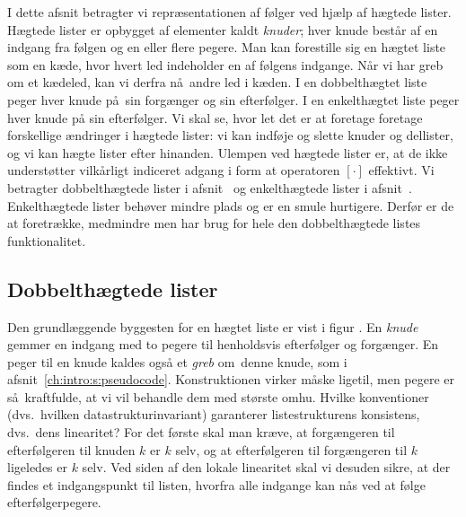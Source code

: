 \newcommand{\friListe}{\Id{friListe}}

I dette afsnit betragter vi repræsentationen af følger ved hjælp af hægtede lister.
Hægtede lister er opbygget af elementer kaldt \emph{knuder};
hver knude består af en indgang fra følgen og en eller flere pegere.
Man kan forestille sig en hægtet liste som en kæde, hvor hvert led indeholder en af følgens indgange.
Når vi har greb om et kædeled, kan vi derfra nå andre led i kæden.
I en dobbelthægtet liste peger hver knude på sin forgænger og sin efterfølger.
I en enkelthægtet liste peger hver knude på sin efterfølger.
Vi skal se, hvor let det er at foretage foretage forskellige ændringer i hægtede lister:
vi kan indføje og slette knuder og dellister, og vi kan hægte lister efter hinanden.
Ulempen ved hægtede lister er, at de ikke understøtter vilkårligt indiceret adgang i form at operatoren $[\cdot]$ effektivt.
Vi betragter dobbelthægtede lister i afsnit~ og enkelthægtede lister i afsnit~.
Enkelthægtede lister behøver mindre plads og er en smule hurtigere.
Derfør er de at  foretrække, medmindre men har brug for hele den dobbelthægtede listes funktionalitet.

\subsection{Dobbelthægtede lister}

Den grundlæggende byggesten for en hægtet liste er vist i figur .
En \emph{knude}%
gemmer en indgang med to pegere til henholdsvis efterfølger og forgænger.
En peger til en knude kaldes også et \emph{greb}
om denne knude, som i afsnit~\ref{ch:intro:s:pseudocode}.
Konstruktionen virker måske ligetil, men pegere er så kraftfulde, at vi vil behandle dem med største omhu.
Hvilke konventioner (dvs.\ hvilken datastruktur\-invariant) garanterer listestrukturens konsistens, dvs.\ dens linearitet?
For det første skal man kræve, at forgængeren til efterfølgeren til knuden $k$ er $k$ selv, og at efterfølgeren til forgængeren til $k$ ligeledes er $k$ selv.
Ved siden af den lokale linearitet skal vi desuden sikre, at der findes et indgangspunkt til listen, hvorfra alle indgange kan nås ved at følge efterfølgerpegere.

